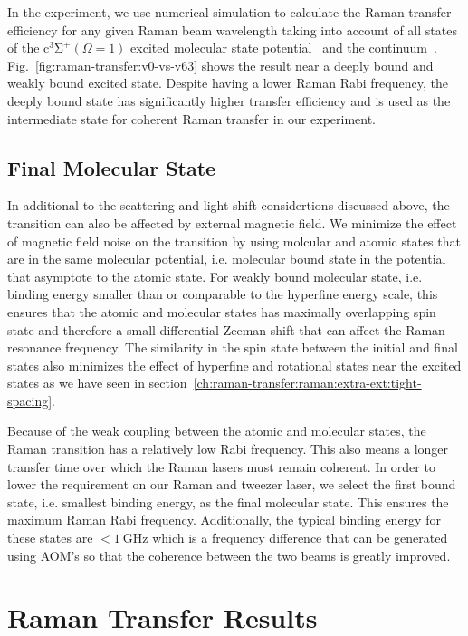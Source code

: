 In the experiment, we use numerical simulation to calculate the Raman transfer efficiency
for any given Raman beam wavelength taking into account of all states of
the $\mathrm{c^3\Sigma^+}(\Omega = 1)$
excited molecular state potential~\cite{grochola_spin-forbidden_2011}
and the continuum~\cite{liu_ultracold_2017}.
Fig.~\ref{fig:raman-transfer:v0-vs-v63} shows the result near a deeply bound
and weakly bound excited state.
Despite having a lower Raman Rabi frequency,
the deeply bound state has significantly higher transfer efficiency
and is used as the intermediate state for coherent Raman transfer in our experiment.

\subsection{Final Molecular State}
\label{ch:raman-transfer:state-selction:final}

In additional to the scattering and light shift considertions discussed above,
the transition can also be affected by external magnetic field.
We minimize the effect of magnetic field noise on the transition by using molcular
and atomic states that are in the same molecular potential,
i.e. molecular bound state in the potential that asymptote to
the atomic state. For weakly bound molecular state,
i.e. binding energy smaller than or comparable to the hyperfine energy scale,
this ensures that the atomic and molecular states has maximally overlapping spin state
and therefore a small differential Zeeman shift that can affect the Raman resonance frequency.
The similarity in the spin state between the initial and final states
also minimizes the effect of hyperfine and rotational states near the excited states
as we have seen in section~\ref{ch:raman-transfer:raman:extra-ext:tight-spacing}.

Because of the weak coupling between the atomic and molecular states,
the Raman transition has a relatively low Rabi frequency.
This also means a longer transfer time over which the Raman lasers must remain coherent.
In order to lower the requirement on our Raman and tweezer laser,
we select the first bound state, i.e. smallest binding energy, as the final molecular state.
This ensures the maximum Raman Rabi frequency.
Additionally, the typical binding energy for these states are $<\!1~\mathrm{GHz}$
which is a frequency difference that can be generated using AOM's
so that the coherence between the two beams is greatly improved.

\section{Raman Transfer Results}
\label{ch:raman-transfer:results}


